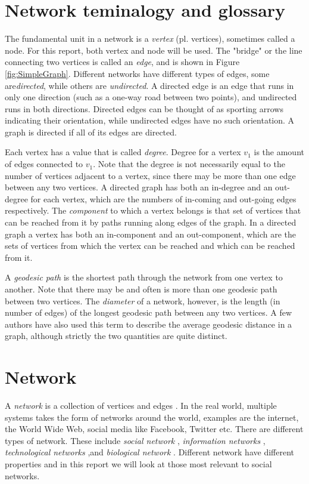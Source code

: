 \section{Network teminalogy and glossary}
The fundamental unit in a network is a \textit{vertex} (pl. vertices), sometimes called a node. For this report, both vertex and node will be used. The "bridge" or the line connecting two vertices is called an \textit{edge}, and is shown in Figure \ref{fig:SimpleGraph}.  Different networks have different types of edges, some are\textit{directed}, while others are \textit{undirected}. A directed edge is an edge that runs in only one direction (such as a one-way road between two points), and undirected runs in both directions. Directed edges can be thought of as sporting arrows indicating their orientation, while undirected edges have no such orientation. A graph is directed if all of its edges are directed.

Each vertex has a value that is called \textit{degree}. Degree for a vertex $v_1$ is the amount of edges connected to $v_1$. Note that the degree is not necessarily equal to the number of vertices adjacent to a vertex, since there may be more than one edge between any two vertices. A directed graph has both an in-degree and an out-degree for each vertex, which are the numbers of in-coming and out-going edges respectively. The \textit{component} to which a vertex belongs is that set of vertices that can be reached from it by paths running along edges of the graph. In a directed graph a vertex has both an in-component and an out-component, which are the sets of vertices from which the vertex can be reached and which can be reached from it.

A \textit{geodesic path} is the shortest path through the network from one vertex to another. Note that there may be and often is more than one geodesic path between two vertices. The \textit{diameter} of a network, however,  is the length (in number of edges) of the longest geodesic path between any two vertices. A few authors have also used this term to describe the average geodesic distance in a graph, although strictly the two quantities are quite distinct.

\section{Network}
A \textit{network} is a collection of vertices and edges  \cite{ComplexNetwork2003}. In the real world, multiple systems takes the form of networks around the world, examples are the internet, the World Wide Web, social media like Facebook, Twitter etc.  There are different types of network. These include  \textit{social network} \cite{ComplexNetwork2003}, \textit{information networks} \cite{ComplexNetwork2003}, \textit{technological networks} \cite{ComplexNetwork2003} ,and \textit{biological network} \cite{ComplexNetwork2003}. Different network have different properties and in this report we will look at those most relevant to social networks.

